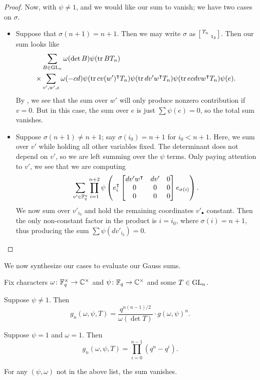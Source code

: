 \begin{proof}
    Now, with $\psi\ne1$, and we would like our sum to vanish; we have two cases on $\sigma$.
    \begin{itemize}
        \item Suppose that $\sigma(n+1)=n+1$. Then we may write $\sigma$ as $\begin{bsmallmatrix}
            T_n \\ & 1_2
        \end{bsmallmatrix}$. Then our sum looks like
        \begin{align*}
            & \sum_{B\in\mathrm{GL}_n}\omega(\det B)\psi(\operatorname{tr} BT_n) \\
            \times{}& \sum_{v',w',e}\omega(-cd)\psi(\operatorname{tr} cv(w')^\intercal T_n)\psi(\operatorname{tr} dv'w^\intercal T_n)\psi(\operatorname{tr} ecdvw^\intercal T_n)\psi(e).
        \end{align*}
        By , we see that the sum over $w'$ will only produce nonzero contribution if $v=0$. But in this case, the sum over $e$ is just $\sum\psi(e)=0$, so the total sum vanishes.
        
        \item Suppose $\sigma(n+1)\ne n+1$; say $\sigma(i_0)=n+1$ for $i_0<n+1$. Here, we sum over $v'$ while holding all other variables fixed. The determinant does not depend on $v'$, so we are left summing over the $\psi$ terms. Only paying attention to $v'$, we see that we are computing
        \[\sum_{v'\in\mathbb F_q^n}\prod_{i=1}^{n+2}\psi\left(e_i^\intercal \begin{bmatrix}
            dv'w^\intercal & dv' & 0 \\
            0 & 0 & 0 \\
            0 & 0 & 0
        \end{bmatrix}e_{\sigma(i)}\right).\]
        We now sum over $v'_{i_0}$ and hold the remaining coordinates $v'_\bullet$ constant. Then the only non-constant factor in the product is $i=i_0$, where $\sigma(i)=n+1$, thus producing the sum $\sum\psi(dv'_{i_0})=0$.
        \qedhere
    \end{itemize}
\end{proof}
We now synthesize our cases to evaluate our Gauss sums.
\begin{theorem} \label{thm:gsum-gl}
    Fix characters $\omega\colon\mathbb F_q^\times\to\mathbb C^\times$ and $\psi\colon\mathbb F_q\to\mathbb C^\times$ and some $T\in\mathrm{GL}_n$.
    \begin{listalph}
        \item Suppose $\psi\ne1$. Then
        \[g_n(\omega,\psi,T)=\frac{q^{n(n-1)/2}}{\omega(\det T)}\cdot g(\omega,\psi)^n.\]
        \item Suppose $\psi=1$ and $\omega=1$. Then
        \[g_n(\omega,\psi,T)=\prod_{i=0}^{n-1}\left(q^n-q^i\right).\]
    \end{listalph}For any $(\psi,\omega)$ not in the above list, the sum vanishes.
\end{theorem}
